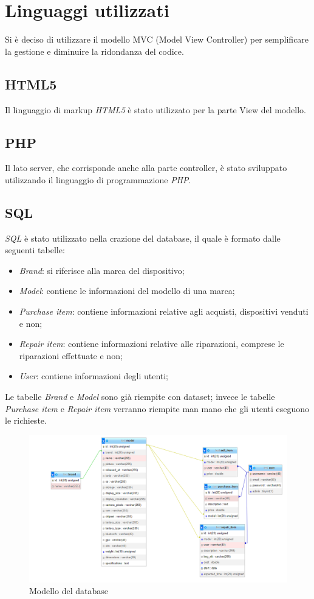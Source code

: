 \section{Linguaggi utilizzati}

Si è deciso di utilizzare il modello MVC (Model View Controller) per semplificare la gestione
e diminuire la ridondanza del codice.

\subsection{HTML5}
Il linguaggio di markup \textit{HTML5} è stato utilizzato per la parte View del modello.

\subsection{PHP}
Il lato server, che corrisponde anche alla parte controller, è stato sviluppato utilizzando il linguaggio di programmazione \textit{PHP}.


\subsection{SQL}
\textit{SQL} è stato utilizzato nella crazione del database, il quale è formato dalle seguenti tabelle:

\begin{itemize}
	\item \textit{Brand}: si riferisce alla marca del dispositivo;
	\item \textit{Model}: contiene le informazioni del modello di una marca;
	\item \textit{Purchase item}: contiene informazioni relative agli acquisti, dispositivi venduti e non;
	\item \textit{Repair item}: contiene informazioni relative alle riparazioni, comprese le riparazioni effettuate e non;
	\item \textit{User}: contiene informazioni degli utenti;
\end{itemize}

Le tabelle \textit{Brand} e \textit{Model} sono già riempite con dataset; invece le tabelle \textit{Purchase item} e \textit{Repair item}
verranno riempite man mano che gli utenti eseguono le richieste.

\begin{figure}[H]
	\centering
	\includegraphics[scale=0.4]{res/database.png}
	\caption{Modello del database}
\end{figure}

